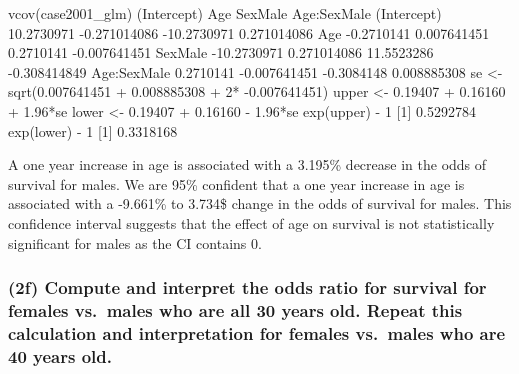 \documentclass[
]{article}
\newenvironment{Shaded}{\begin{snugshade}}{\end{snugshade}}
\newcommand{\DecValTok}[1]{\textcolor[rgb]{0.00,0.00,0.81}{#1}}
\newcommand{\FloatTok}[1]{\textcolor[rgb]{0.00,0.00,0.81}{#1}}
\newcommand{\FunctionTok}[1]{\textcolor[rgb]{0.00,0.00,0.00}{#1}}
\newcommand{\NormalTok}[1]{#1}
\newcommand{\OtherTok}[1]{\textcolor[rgb]{0.56,0.35,0.01}{#1}}
\newcommand{\SpecialCharTok}[1]{\textcolor[rgb]{0.00,0.00,0.00}{#1}}
\begin{document}
\begin{Shaded}
\begin{Highlighting}[]
\FunctionTok{vcov}\NormalTok{(case2001\_glm)}
\NormalTok{            (Intercept)          Age     SexMale  Age}\SpecialCharTok{:}\NormalTok{SexMale}
\NormalTok{(Intercept)  }\FloatTok{10.2730971} \SpecialCharTok{{-}}\FloatTok{0.271014086} \SpecialCharTok{{-}}\FloatTok{10.2730971}  \FloatTok{0.271014086}
\NormalTok{Age          }\SpecialCharTok{{-}}\FloatTok{0.2710141}  \FloatTok{0.007641451}   \FloatTok{0.2710141} \SpecialCharTok{{-}}\FloatTok{0.007641451}
\NormalTok{SexMale     }\SpecialCharTok{{-}}\FloatTok{10.2730971}  \FloatTok{0.271014086}  \FloatTok{11.5523286} \SpecialCharTok{{-}}\FloatTok{0.308414849}
\NormalTok{Age}\SpecialCharTok{:}\NormalTok{SexMale   }\FloatTok{0.2710141} \SpecialCharTok{{-}}\FloatTok{0.007641451}  \SpecialCharTok{{-}}\FloatTok{0.3084148}  \FloatTok{0.008885308}
\NormalTok{se }\OtherTok{\textless{}{-}} \FunctionTok{sqrt}\NormalTok{(}\FloatTok{0.007641451} \SpecialCharTok{+} \FloatTok{0.008885308} \SpecialCharTok{+} \DecValTok{2}\SpecialCharTok{*} \SpecialCharTok{{-}}\FloatTok{0.007641451}\NormalTok{)}
\NormalTok{upper }\OtherTok{\textless{}{-}} \FloatTok{0.19407} \SpecialCharTok{+} \FloatTok{0.16160} \SpecialCharTok{+} \FloatTok{1.96}\SpecialCharTok{*}\NormalTok{se }
\NormalTok{lower }\OtherTok{\textless{}{-}} \FloatTok{0.19407} \SpecialCharTok{+} \FloatTok{0.16160} \SpecialCharTok{{-}} \FloatTok{1.96}\SpecialCharTok{*}\NormalTok{se}
\FunctionTok{exp}\NormalTok{(upper) }\SpecialCharTok{{-}} \DecValTok{1}
\NormalTok{[}\DecValTok{1}\NormalTok{] }\FloatTok{0.5292784}
\FunctionTok{exp}\NormalTok{(lower) }\SpecialCharTok{{-}} \DecValTok{1}
\NormalTok{[}\DecValTok{1}\NormalTok{] }\FloatTok{0.3318168}
\end{Highlighting}
\end{Shaded}

A one year increase in age is associated with a 3.195\% decrease in the
odds of survival for males. We are 95\% confident that a one year
increase in age is associated with a -9.661\% to 3.734\$ change in the
odds of survival for males. This confidence interval suggests that the
effect of age on survival is not statistically significant for males as
the CI contains 0.

\hypertarget{f-compute-and-interpret-the-odds-ratio-for-survival-for-females-vs.-males-who-are-all-30-years-old.-repeat-this-calculation-and-interpretation-for-females-vs.-males-who-are-40-years-old.}{%
\subsubsection{(2f) Compute and interpret the odds ratio for survival
for females vs.~males who are all 30 years old. Repeat this calculation
and interpretation for females vs.~males who are 40 years
old.}\label{f-compute-and-interpret-the-odds-ratio-for-survival-for-females-vs.-males-who-are-all-30-years-old.-repeat-this-calculation-and-interpretation-for-females-vs.-males-who-are-40-years-old.}}
\end{document}

